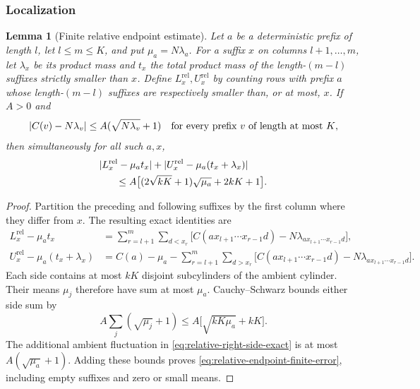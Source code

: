 \documentclass[11pt]{article}
\numberwithin{equation}{section}
\newtheorem{lemma}[theorem]{Lemma}
\theoremstyle{definition}
\theoremstyle{remark}
\newcommand{\1}{\mathbf 1}
\begin{document}
\subsubsection{Localization}

\begin{lemma}[Finite relative endpoint estimate]
\label{lem:finite-relative-endpoints}
Let \(a\) be a deterministic prefix of length \(l\), let
\(l\le m\le K\), and put \(\mu_a=N\lambda_a\).
For a suffix \(x\) on columns \(l+1,\ldots,m\), let
\(\lambda_x\) be its product mass and \(t_x\) the total product
mass of the length-\((m-l)\) suffixes strictly smaller than \(x\).
Define \(L_x^{\mathrm{rel}},U_x^{\mathrm{rel}}\) by counting rows
with prefix \(a\) whose length-\((m-l)\) suffixes are respectively
smaller than, or at most, \(x\).
If \(A>0\) and
\[
 |C(v)-N\lambda_v|\le A(\sqrt{N\lambda_v}+1)
 \quad\hbox{for every prefix \(v\) of length at most \(K\)},
\]
then simultaneously for all such \(a,x\),
\begin{equation}
\label{eq:relative-endpoint-finite-error}
\begin{split}
 &|L_x^{\mathrm{rel}}-\mu_at_x|
  +|U_x^{\mathrm{rel}}-\mu_a(t_x+\lambda_x)|\\
 &\hspace{6mm}\le
 A\bigl[(2\sqrt{kK}+1)\sqrt{\mu_a}+2kK+1\bigr].
\end{split}
\end{equation}
\end{lemma}

\begin{proof}
Partition the preceding and following suffixes by the first column
where they differ from \(x\).  The resulting exact identities are
\begin{align}
\label{eq:relative-left-side-exact}
 L_x^{\mathrm{rel}}-\mu_at_x
 &=\sum_{r=l+1}^m\sum_{d<x_r}
   \bigl[C(ax_{l+1}\cdots x_{r-1}d)
          -N\lambda_{ax_{l+1}\cdots x_{r-1}d}\bigr],\\
\label{eq:relative-right-side-exact}
 U_x^{\mathrm{rel}}-\mu_a(t_x+\lambda_x)
 &=C(a)-\mu_a
  -\sum_{r=l+1}^m\sum_{d>x_r}
   \bigl[C(ax_{l+1}\cdots x_{r-1}d)
          -N\lambda_{ax_{l+1}\cdots x_{r-1}d}\bigr].
\end{align}
Each side contains at most \(kK\) disjoint subcylinders of the
ambient cylinder.  Their means \(\mu_j\) therefore have sum at
most \(\mu_a\).  Cauchy--Schwarz bounds either side sum by
\[
 A\sum_j(\sqrt{\mu_j}+1)
 \le A\bigl[\sqrt{kK\mu_a}+kK\bigr].
\]
The additional ambient fluctuation in
\eqref{eq:relative-right-side-exact} is at most
\(A(\sqrt{\mu_a}+1)\).  Adding these bounds proves
\eqref{eq:relative-endpoint-finite-error}, including empty suffixes
and zero or small means.
\end{proof}
\end{document}
